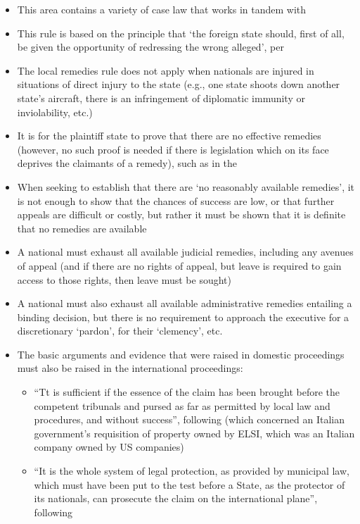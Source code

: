 \begin{itemize}
    \item This area contains a variety of case law that works in tandem with 
    \item This rule is based on the principle that `the foreign state should, first of all, be given the opportunity of redressing the wrong alleged', per 
    \item The local remedies rule does not apply when nationals are injured in situations of direct injury to the state (e.g., one state shoots down another state's aircraft, there is an infringement of diplomatic immunity or inviolability, etc.)
    \item It is for the plaintiff state to prove that there are no effective remedies (however, no such proof is needed if there is legislation which on its face deprives the claimants of a remedy), such as in the 
    \item When seeking to establish that there are `no reasonably available remedies', it is not enough to show that the chances of success are low, or that further appeals are difficult or costly, but rather it must be shown that it is definite that no remedies are available
    \item A national must exhaust all available judicial remedies, including any avenues of appeal (and if there are no rights of appeal, but leave is required to gain access to those rights, then leave must be sought)
    \item A national must also exhaust all available administrative remedies entailing a binding decision, but there is no requirement to approach the executive for a discretionary `pardon', for their `clemency', etc.
    \item The basic arguments and evidence that were raised in domestic proceedings must also be raised in the international proceedings:
    \begin{itemize}
        \item ``Tt is sufficient if the essence of the claim has been brought before the competent tribunals and pursed as far as permitted by local law and procedures, and without success'', following  (which concerned an Italian government's requisition of property owned by ELSI, which was an Italian company owned by US companies)
        \item ``It is the whole system of legal protection, as provided by municipal law, which must have been put to the test before a State, as the protector of its nationals, can prosecute the claim on the international plane'', following 

\end{itemize}
\end{itemize}
